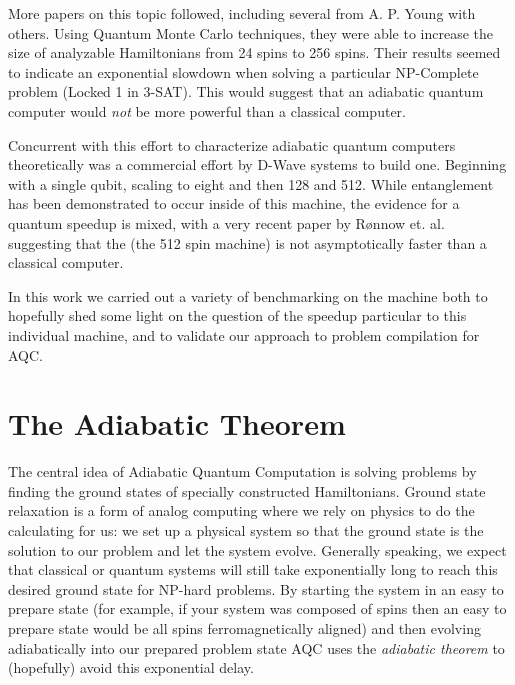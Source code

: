 More papers on this topic followed, including several from A. P. Young with others.\cite{young3}\cite{young2}\cite{young1}  Using Quantum Monte Carlo techniques, they were able to increase the size of analyzable Hamiltonians from 24 spins to 256 spins.\cite{young1}
Their results seemed to indicate an exponential slowdown when solving a particular NP-Complete problem (Locked 1 in 3-SAT).\cite{young2}  This would suggest that an adiabatic quantum computer would \emph{not} be more powerful than a classical computer.

Concurrent with this effort to characterize adiabatic quantum computers theoretically was a commercial effort by D-Wave systems to build one.  Beginning with a single qubit\cite{qubit}, scaling to eight\cite{PhysRevB.82.024511} and then 128\cite{boixo2} and 512.\cite{pudenz}  While entanglement has been demonstrated to occur inside of this machine\cite{lanting}, the evidence for a quantum speedup is mixed,\cite{pudenz}\cite{boixo}\cite{smolin} with a very recent paper by R{\o}nnow et. al. suggesting that the \machine (the 512 spin machine) is not asymptotically faster than a classical computer.\cite{speedup}

In this work we carried out a variety of benchmarking on the \machine machine both to hopefully shed some light on the question of the speedup particular to this individual machine, and to validate our approach to problem compilation for AQC.

\section{The Adiabatic Theorem}

The central idea of Adiabatic Quantum Computation is solving problems by finding the ground states of specially constructed Hamiltonians.\cite{farhi}  Ground state relaxation is a form of analog computing where we rely on physics to do the calculating for us: we set up a physical system so that the ground state is the solution to our problem and let the system evolve.  Generally speaking, we expect that classical or quantum systems will still take exponentially long to reach this desired ground state for NP-hard problems.\cite{aaronson}
By starting the system in an easy to prepare state (for example, if your system was composed of spins then an easy to prepare state would be all spins ferromagnetically aligned) and then evolving adiabatically into our prepared problem state AQC uses the \emph{adiabatic theorem} to (hopefully) avoid this exponential delay.

